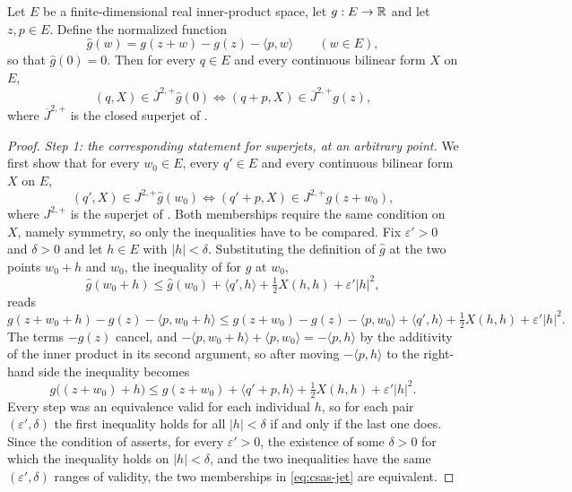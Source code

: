 \begin{lemma}
Let $E$ be a finite-dimensional real inner-product space, let $g:E\to\mathbb{R}$ and let
$z,p\in E$. Define the normalized function
\[
  \widehat g(w)=g(z+w)-g(z)-\langle p,w\rangle\qquad(w\in E),
\]
so that $\widehat g(0)=0$. Then for every $q\in E$ and every continuous bilinear
form $X$ on $E$,
\[
  (q,X)\in\overline J^{2,+}\widehat g(0)
  \iff
  (q+p,X)\in\overline J^{2,+}g(z),
\]
where $\overline J^{2,+}$ is the closed superjet of .
\end{lemma}
\begin{proof}
\emph{Step 1: the corresponding statement for superjets, at an arbitrary point.}
We first show that for every $w_0\in E$, every $q'\in E$ and every continuous
bilinear form $X$ on $E$,
\begin{equation}\label{eq:csas-jet}
  (q',X)\in J^{2,+}\widehat g(w_0)
  \iff
  (q'+p,X)\in J^{2,+}g(z+w_0),
\end{equation}
where $J^{2,+}$ is the superjet of . Both memberships require
the same condition on $X$, namely symmetry, so only the inequalities have to be
compared. Fix $\varepsilon'>0$ and $\delta>0$ and let $h\in E$ with
$|h|<\delta$. Substituting the definition of $\widehat g$ at the two points
$w_0+h$ and $w_0$, the inequality of  for $\widehat g$ at
$w_0$,
\[
  \widehat g(w_0+h)\le\widehat g(w_0)+\langle q',h\rangle+\tfrac12X(h,h)
    +\varepsilon'|h|^2,
\]
reads
\[
  g(z+w_0+h)-g(z)-\langle p,w_0+h\rangle
   \le g(z+w_0)-g(z)-\langle p,w_0\rangle+\langle q',h\rangle+\tfrac12X(h,h)
     +\varepsilon'|h|^2 .
\]
The terms $-g(z)$ cancel, and
$-\langle p,w_0+h\rangle+\langle p,w_0\rangle=-\langle p,h\rangle$ by the
additivity of the inner product in its second argument, so after moving
$-\langle p,h\rangle$ to the right-hand side the inequality becomes
\[
  g\bigl((z+w_0)+h\bigr)\le g(z+w_0)+\langle q'+p,h\rangle+\tfrac12X(h,h)
    +\varepsilon'|h|^2 .
\]
Every step was an equivalence valid for each individual $h$, so for each pair
$(\varepsilon',\delta)$ the first inequality holds for all $|h|<\delta$ if and
only if the last one does. Since the condition of  asserts, for
every $\varepsilon'>0$, the existence of some $\delta>0$ for which the
inequality holds on $|h|<\delta$, and the two inequalities have the same
$(\varepsilon',\delta)$ ranges of validity, the two memberships in
\eqref{eq:csas-jet} are equivalent.


\end{proof}
